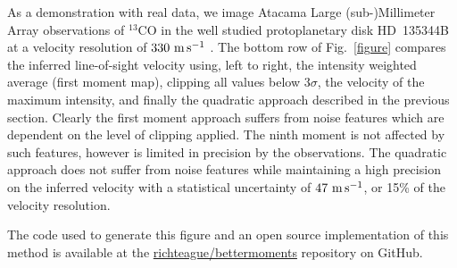\documentclass[rnaas]{aastex62}
\begin{document}
As a demonstration with real data, we image Atacama Large (sub-)Millimeter Array observations of $^{13}$CO in the well studied protoplanetary disk HD~135344B at a velocity resolution of $330~{\rm m\,s^{-1}}$ \citep[ALMA Project 2012.1.00158.S]{vanderMarel:2016} . The bottom row of Fig.~\ref{figure} compares the inferred line-of-sight velocity using, left to right, the intensity weighted average (first moment map), clipping all values below $3\sigma$, the velocity of the maximum intensity, and finally the quadratic approach described in the previous section. Clearly the first moment approach suffers from noise features which are dependent on the level of clipping applied. The ninth moment is not affected by such features, however is limited in precision by the observations. The quadratic approach does not suffer from noise features while maintaining a high precision on the inferred velocity with a statistical uncertainty of $47~{\rm m\,s^{-1}}$, or 15\% of the velocity resolution.

The code used to generate this figure and an open source implementation of this method is available at the \href{https://github.com/richteague/bettermoments}{richteague/bettermoments} repository on GitHub.


\end{document}
